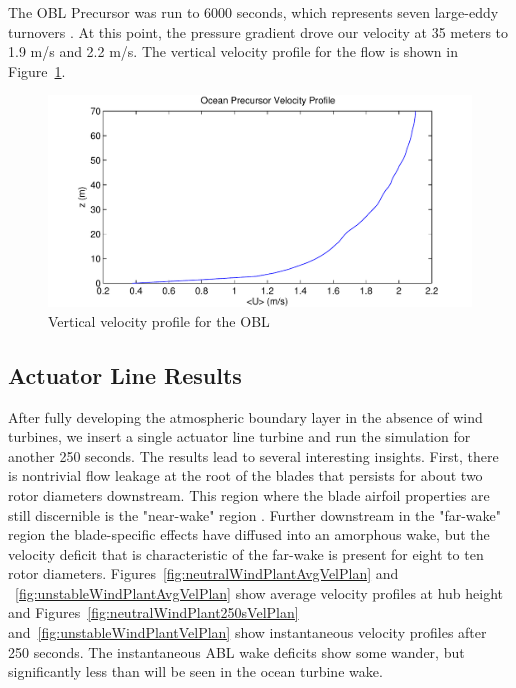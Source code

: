 The OBL Precursor was run to 6000 seconds, which represents seven large-eddy turnovers \cite{churchfield_large-eddy_2012}. At this point, the pressure gradient drove our velocity at 35 meters to 1.9 m/s and 2.2 m/s. The vertical velocity profile for the flow is shown in Figure~\ref{fig:ocean-vertical-speed-profile}.

\begin{figure}
\centering
\includegraphics[width=.6\textwidth]{images/ocean-vertical-speed-profile}
\caption{Vertical velocity profile for the OBL}
\label{fig:ocean-vertical-speed-profile}
\end{figure}

\subsection{Actuator Line Results}
After fully developing the atmospheric boundary layer in the absence of wind turbines, we insert a single actuator line turbine and run the simulation for another 250 seconds.  The results lead to several interesting insights.  First, there is nontrivial flow leakage at the root of the blades that persists for about two rotor diameters downstream.  This region where the blade airfoil properties are still discernible is the "near-wake" region \cite{sanderse_review_2011}.  Further downstream in the "far-wake" region the blade-specific effects have diffused into an amorphous wake, but the velocity deficit that is characteristic of the far-wake is present for eight to ten rotor diameters.  Figures~\ref{fig:neutralWindPlantAvgVelPlan} and ~\ref{fig:unstableWindPlantAvgVelPlan} show average velocity profiles at hub height and Figures~\ref{fig:neutralWindPlant250sVelPlan} and~\ref{fig:unstableWindPlantVelPlan} show instantaneous velocity profiles after 250 seconds.  The instantaneous ABL wake deficits show some wander, but significantly less than will be seen in the ocean turbine wake.

